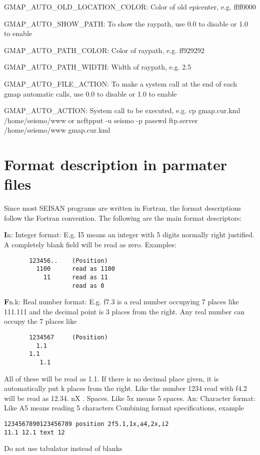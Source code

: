 GMAP\_AUTO\_OLD\_LOCATION\_COLOR: Color of old epicenter, e.g. ffff0000

GMAP\_AUTO\_SHOW\_PATH: To show the raypath, use 0.0 to disable or 1.0 to enable

GMAP\_AUTO\_PATH\_COLOR: Color of raypath, e.g. ff929292

GMAP\_AUTO\_PATH\_WIDTH: Width of raypath, e.g. 2.5

GMAP\_AUTO\_FILE\_ACTION: To make a system call at the end of each gmap automatic calls, use 0.0 to disable or 1.0 to enable

GMAP\_AUTO\_ACTION: System call to be executed, e.g. cp gmap.cur.kml /home/seismo/www or 
 ncftpput -u seismo -p passwd ftp.server /home/seismo/www gmap.cur.kml



\section{Format description in parmater files}

Since most SEISAN programs are written in Fortran, the format descriptions follow the Fortran convention. The following are the main format descriptors: 

\textbf{I}n: Integer format: E.g. I5 means an integer with 5 digits normally right justified. A completely blank field will be read as zero. Examples: 

\begin{verbatim}
       123456..    (Position)
         1100      read as 1100  
           11      read as 11  
                   read as 0  
\end{verbatim}

\textbf{F}n.k: Real number format: E.g. f7.3 is a real number occupying 7 places like 111.111 and the decimal point is 3 places from the right. Any real number can occupy the 7 places like 

\begin{verbatim}
       1234567     (Position)
         1.1 
       1.1 
          1.1
\end{verbatim}

All of these will be read as 1.1. If there is no decimal place given, it is automatically put k places from the right. Like the number 1234 read with f4.2 will be read as 12.34. 
nX . Spaces. Like 5x means 5 spaces.\newline
An: Character format: Like A5 means reading 5 characters\newline
Combining format specifications, example

\begin{verbatim}
1234567890123456789 position 2f5.1,1x,a4,2x,i2
11.1 12.1 text 12 
\end{verbatim}

Do not use tabulator instead of blanks 

%

